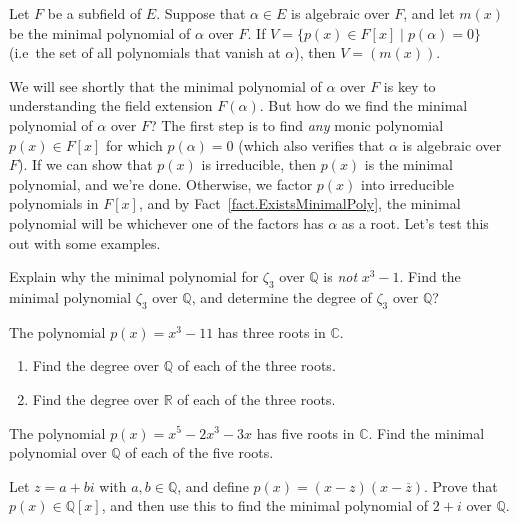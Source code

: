 \begin{theorem}
Let $F$ be a subfield of $E$. Suppose that $\alpha\in E$ is algebraic over $F$, and let $m(x)$ be the minimal polynomial of $\alpha$ over $F$. If $V = \{p(x)\in F[x]\mid p(\alpha) = 0\}$ (i.e~the set of all polynomials that vanish at $\alpha$), then $V = (m(x))$.
\end{theorem}


We will see shortly that the minimal polynomial of $\alpha$ over $F$ is key to understanding the field extension $F(\alpha)$. But how do we find the minimal polynomial of $\alpha$ over $F$? The first step is to find \emph{any} monic polynomial $p(x)\in F[x]$ for which $p(\alpha) = 0$ (which also verifies that $\alpha$ is algebraic over $F$). If we can show that $p(x)$ is irreducible, then $p(x)$ is the minimal polynomial, and we're done. Otherwise, we factor $p(x)$ into irreducible polynomials in $F[x]$, and  by Fact~\ref{fact.ExistsMinimalPoly}, the minimal polynomial will be whichever one of the factors has $\alpha$ as a root. Let's test this out with some examples. 

\begin{problem}\label{prob.MinPolyZeta3}
Explain why the minimal polynomial for $\zeta_3$ over $\mathbb{Q}$ is \textit{not} $x^3-1$. Find the minimal polynomial  $\zeta_3$ over $\mathbb{Q}$, and determine the degree of  $\zeta_3$ over $\mathbb{Q}$?
\end{problem}

\begin{problem}\label{prob.MinPolyCubeRoot11}
The polynomial $p(x) = x^3-11$ has three roots in $\mathbb{C}$. 
\begin{enumerate}
\item Find the degree over $\mathbb{Q}$ of each of the three roots.
\item Find the degree over $\mathbb{R}$ of each of the three roots.
\end{enumerate}
\end{problem}


\begin{problem}
The polynomial $p(x) = x^5-2x^3-3x$ has five roots in $\mathbb{C}$. Find the minimal polynomial over $\mathbb{Q}$ of each of the five roots.
\end{problem}

\begin{problem}
Let $z = a+bi$ with $a,b\in \mathbb{Q}$, and define $p(x) = (x-z)(x-\overline{z})$. Prove that $p(x)\in \mathbb{Q}[x]$, and then use this to find the minimal polynomial of $2+i$ over $\mathbb{Q}$.
\end{problem}

